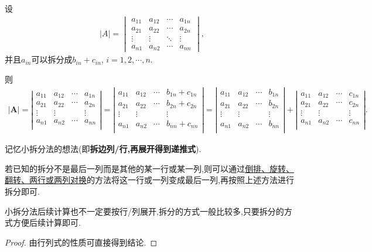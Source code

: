 \documentclass[lang=cn,newtx,10pt,scheme=chinese]{elegantbook}
\begin{document}
\begin{proposition}\label{小拆分法}
设
\begin{align*}
|A| = 
\begin{vmatrix}
a_{11} & a_{12} & \cdots & a_{1n} \\
a_{21} & a_{22} & \cdots & a_{2n} \\
\vdots & \vdots & \ddots & \vdots \\
a_{n1} & a_{n2} & \cdots & a_{nn}
\end{vmatrix},
\nonumber
\end{align*}
并且$a_{in}$可以拆分成$b_{in}+c_{in}$,$\,\,i=1,2,\cdots,n.$

则
\begin{align*}
\left| \boldsymbol{A} \right|=\left| \begin{matrix}
a_{11}&		a_{12}&		\cdots&		a_{1n}\\
a_{21}&		a_{22}&		\cdots&		a_{2n}\\
\vdots&		\vdots&		&		\vdots\\
a_{n1}&		a_{n2}&		\cdots&		a_{nn}\\
\end{matrix} \right|=\left| \begin{matrix}
a_{11}&		a_{12}&		\cdots&		b_{1n}+c_{1n}\\
a_{21}&		a_{22}&		\cdots&		b_{2n}+c_{2n}\\
\vdots&		\vdots&		&		\vdots\\
a_{n1}&		a_{n2}&		\cdots&		b_{nn}+c_{nn}\\
\end{matrix} \right|=\left| \begin{matrix}
a_{11}&		a_{12}&		\cdots&		b_{1n}\\
a_{21}&		a_{22}&		\cdots&		b_{2n}\\
\vdots&		\vdots&		&		\vdots\\
a_{n1}&		a_{n2}&		\cdots&		b_{nn}\\
\end{matrix} \right|+\left| \begin{matrix}
a_{11}&		a_{12}&		\cdots&		c_{1n}\\
a_{21}&		a_{22}&		\cdots&		c_{2n}\\
\vdots&		\vdots&		&		\vdots\\
a_{n1}&		a_{n2}&		\cdots&		c_{nn}\\
\end{matrix} \right|.
\end{align*}
\end{proposition}
\begin{note}
记忆小拆分法的想法(即\textbf{拆边列/行,再展开得到递推式}).
\end{note}
\begin{remark}
若已知的拆分不是最后一列而是其他的某一行或某一列,则可以通过\hyperref[pro:行列式计算常识]{倒排、旋转、翻转、两行或两列对换}的方法将这一行或一列变成最后一列,再按照上述方法进行拆分即可.

小拆分法后续计算也不一定要按行/列展开,拆分的方式一般比较多,只要拆分的方式方便后续计算即可. 
\end{remark}
\begin{proof}
由行列式的性质可直接得到结论.
\end{proof}
\end{document}
